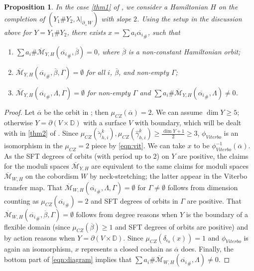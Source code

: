 \documentclass[reqno,11pt]{amsart}
\numberwithin{equation}{section}
\newtheorem{proposition}[theorem]{\textbf{Proposition}}
\def\D{{\mathbb D}}
\def\cM{{\mathcal M}}
\begin{document}
\begin{proposition}\label{prop:corb}
 In the case \eqref{thm1} of  , we consider a Hamiltonian $H$ on the completion of $(Y_1\#Y_2,\lambda|_{\partial_+W})$ with slope $2$. Using the setup in the discussion above for $Y=Y_1\#Y_2$, there exists $x=\sum a_i\overline{\alpha_i}_\#$, such that 
\begin{enumerate}
    \item\label{c1} $\sum a_i\#\overline{\cM}_{Y,H}(\overline{\alpha_i}_{\#},\overline{\beta})=0$, where $\overline{\beta}$ is a non-constant Hamiltonian orbit; 
    \item\label{c2} $\overline{\cM}_{Y,H}(\overline{\alpha_i}_{\#},\overline{\beta},\Gamma)=\emptyset$ for all $i$, $\overline{\beta}$, and non-empty $\Gamma$;
    \item\label{c3} $\overline{\cM}_{Y,H}(\overline{\alpha_i}_{\#},\Lambda,\Gamma)=\emptyset$ for non-empty $\Gamma$ and $\sum a_i\#\overline{\cM}_{Y,H}(\overline{\alpha_i}_{\#},\Lambda) \ne 0$.
\end{enumerate}
\end{proposition}	
\begin{proof} 
    Let $\overline{\alpha}$ be the orbit in ; then $\mu_{CZ}(\overline{\alpha})=2$.  We can assume $\dim Y\ge 5$; otherwise $Y=\partial(V\times \D)$ with a surface $V$ with boundary, which will be dealt with in \eqref{thm2} of . Since $\mu_{CZ}(\check{\gamma}_{h,i}^k),\mu_{CZ}(\hat{\gamma}_{h,i}^k)\ge \frac{\dim Y+1}{2}\ge 3$, $\phi_{Viterbo}$ is an isomorphism in the $\mu_{CZ}=2$ piece by \eqref{eqn:vit}.  We can take $x$ to be $\phi^{-1}_{Viterbo}(\overline{\alpha})$. As the SFT degrees of orbits (with period up to $2$) on $Y$ are positive, the claims for the moduli spaces $\overline{\cM}_{Y,H}$ are equivalent to the same claims for moduli spaces $\overline{\cM}_{W,H}$ on the cobordism $W$ by neck-stretching; the latter appear in the Viterbo transfer map. That $\overline{\cM}_{W,H}(\overline{\alpha_i}_{\#},\Lambda,\Gamma)=\emptyset$ for $\Gamma \ne \emptyset$ follows from dimension counting as $\mu_{CZ}(\overline{\alpha_i}_\#)=2$ and SFT degrees of orbits in $\Gamma$ are positive. That $\overline{\cM}_{W,H}(\overline{\alpha_i}_{\#},\overline{\beta},\Gamma)=\emptyset$ follows from degree reasons when $Y$ is the boundary of a flexible domain (since $\mu_{CZ}(\overline{\beta})\ge 1$ and SFT degrees of orbits are positive) and by action reasons when $Y=\partial(V\times \D)$.  Since $\mu_{CZ}(\delta_{\epsilon_0}(x))=1$ and $\phi_{Viterbo}$ is again an isomorphism, $x$ represents a closed cochain as $\overline{\alpha}$ does.  Finally, the bottom part of \eqref{eqn:diagram} implies that  $\sum a_i\#\overline{\cM}_{W,H}(\overline{\alpha_i}_{\#},\Lambda) \ne 0$.
\end{proof}
\end{document}
